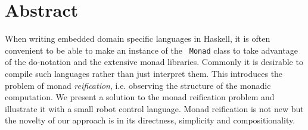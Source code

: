 \section*{Abstract}
When writing embedded domain specific languages in Haskell, it is
often convenient to be able to make an instance of the {\tt
Monad} class to take advantage of the do-notation and the extensive
monad libraries. Commonly it is desirable to compile such languages 
rather than just interpret them.
This introduces the problem of monad {\em reification}, i.e. observing 
the structure of the monadic computation.
We present a solution to the monad reification problem and
illustrate it with a small robot control language.
Monad reification is not new but the novelty
of our approach is in its directness, simplicity and compositionality.



%


